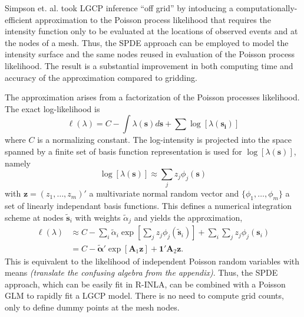 \documentclass[]{interact}
\begin{document}
Simpson et. al. took LGCP inference ``off grid'' by intoducing a
computationally-efficient approximation to the Poisson process likelihood that
requires the intensity function only to be evaluated at the locations of
observed events and at the nodes of a mesh. Thus, the SPDE approach can be
employed to model the intensity surface and the same nodes reused in
evaluation of the Poisson process likelihood. The result is a substantial
improvement in both computing time and accuracy of the approximation compared
to gridding.


The approximation arises from a factorization of the Poisson processes
likelihood. The exact log-likelihood is
\begin{displaymath}
\ell(\lambda) = C - \int \lambda(\mathbf{s}) d\mathbf{s}
+ \sum \log\left[\lambda(\mathbf{s_{i}})\right]
\end{displaymath}
where \(C\) is a normalizing constant. The log-intensity is projected into the
space spanned by a finite set of basis function
representation is used for \(\log[\lambda(\mathbf{s})]\), namely
\begin{displaymath}
\log\left[\lambda(\mathbf{s})\right]
\approx \sum_{j} z_{j} \phi_{j}(\mathbf{s})
\end{displaymath}
with \(\mathbf{z} = (z_{1}, \dots, z_{m})'\) a multivariate normal random
vector and \(\{\phi_{1}, \dots, \phi_{m}\}\) a set of linearly independant
basis functions.
This defines a numerical integration scheme at nodes \(\tilde{\mathbf{s}}_{i}\)
with weights \(\tilde{\alpha}_{j}\) and yields the approximation,
\begin{align*}
\ell(\lambda) &\approx C - \sum_{i} \tilde{\alpha}_{i}
\exp\left[\sum_{j} z_{j}\phi_{j}(\tilde{\mathbf{s}}_{i})\right]
+ \sum_{i} \sum_{j} z_{j}\phi_{j}(\mathbf{s}_{i}) \\
& = C - \tilde{\boldsymbol{\alpha}}'
\exp\left[\mathbf{A}_{1} \mathbf{z}\right]
+ \mathbf{1}' \mathbf{A}_{2} \mathbf{z}.
\end{align*}
This is equivalent to the likelihood of independent Poisson random variables
with means {\it (translate the confusing algebra from the appendix)}. Thus,
the SPDE approach, which can be easily fit in R-INLA, can be combined with a
Poisson GLM to rapidly fit a LGCP model. There is no need to compute grid
counts, only to define dummy points at the mesh nodes.
\end{document}
